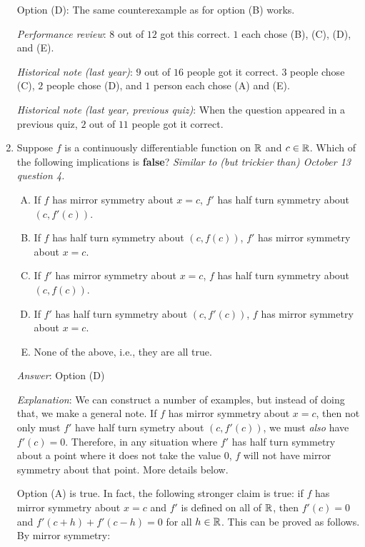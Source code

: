 \documentclass[10pt]{amsart}
\begin{document}
\begin{enumerate}
  Option (D): The same counterexample as for option (B) works.

  {\em Performance review}: $8$ out of $12$ got this correct. $1$ each
  chose (B), (C), (D), and (E).

  {\em Historical note (last year)}: $9$ out of $16$ people got it
  correct. $3$ people chose (C), $2$ people chose (D), and $1$ person
  each chose (A) and (E).

  {\em Historical note (last year, previous quiz)}: When the question
  appeared in a previous quiz, $2$ out of $11$ people got it correct.

\item Suppose $f$ is a continuously differentiable function on $\mathbb{R}$
  and $c \in \mathbb{R}$. Which of the following implications is {\bf false}?
  {\em Similar to (but trickier than) October 13 question 4.}

  \begin{enumerate}[(A)]
  \item If $f$ has mirror symmetry about $x = c$, $f'$ has half turn
    symmetry about $(c,f'(c))$.
  \item If $f$ has half turn symmetry about $(c,f(c))$, $f'$ has
    mirror symmetry about $x = c$.
  \item If $f'$ has mirror symmetry about $x = c$, $f$ has half turn
    symmetry about $(c,f(c))$.
  \item If $f'$ has half turn symmetry about $(c,f'(c))$, $f$ has
    mirror symmetry about $x = c$.
  \item None of the above, i.e., they are all true.
  \end{enumerate}

  {\em Answer}: Option (D)

  {\em Explanation}: We can construct a number of examples, but
  instead of doing that, we make a general note. If $f$ has mirror
  symmetry about $x = c$, then not only must $f'$ have half turn
  symetry about $(c,f'(c))$, we must {\em also} have $f'(c) =
  0$. Therefore, in any situation where $f'$ has half turn symmetry
  about a point where it does not take the value $0$, $f$ will not
  have mirror symmetry about that point. More details below.

  Option (A) is true. In fact, the following stronger claim is true:
  if $f$ has mirror symmetry about $x = c$ and $f'$ is defined on all
  of $\mathbb{R}$, then $f'(c) = 0$ and $f'(c + h) + f'(c - h) = 0$ for all $h
  \in \mathbb{R}$. This can be proved as follows. By mirror symmetry:


\end{enumerate}
\end{document}
